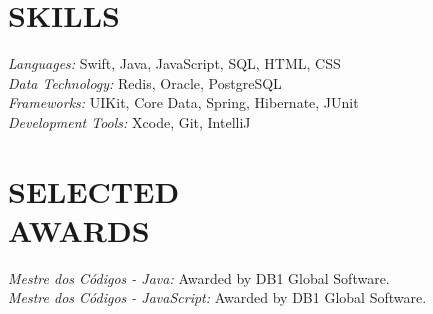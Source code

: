 \documentclass[line,margin]{res}
\begin{document}
\begin{resume}
\section{SKILLS}
  {\sl Languages:} Swift, Java, JavaScript, SQL, HTML, CSS \\
  {\sl Data Technology:} Redis, Oracle, PostgreSQL \\
  {\sl Frameworks:} UIKit, Core Data, Spring, Hibernate, JUnit \\
  {\sl Development Tools:} Xcode, Git, IntelliJ


\section{SELECTED \\ AWARDS}             
  {\sl Mestre dos C\'odigos - Java:} Awarded by DB1 Global Software.\\
  {\sl Mestre dos C\'odigos - JavaScript:} Awarded by DB1 Global Software.\\
 

\end{resume}
\end{document}
